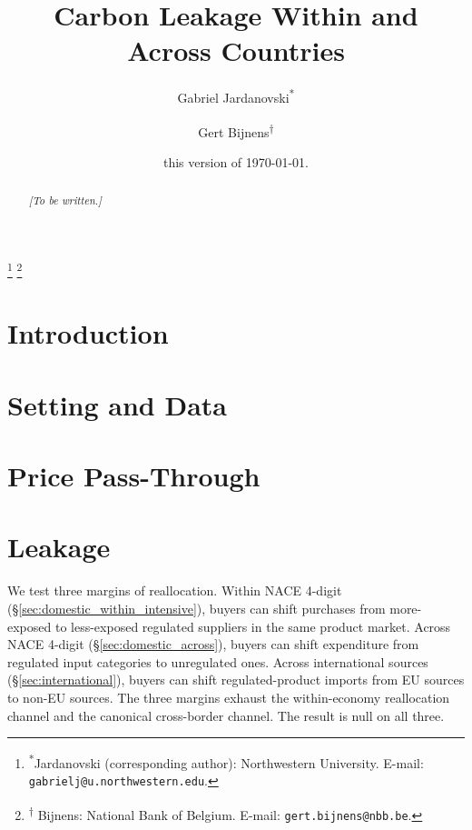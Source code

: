 \documentclass[11pt, reqno]{amsart}
\theoremstyle{definition}
\begin{document}
\title[]{Carbon Leakage Within and Across Countries}

\author[]{Gabriel Jardanovski\textsuperscript{*} \and Gert Bijnens\textsuperscript{$\dagger$}}
\thanks{\noindent \textsuperscript{*}Jardanovski (corresponding author): Northwestern University. E-mail: \texttt{gabrielj@u.northwestern.edu}.}
\thanks{\textsuperscript{$\dagger$} Bijnens: National Bank of Belgium. E-mail: \texttt{gert.bijnens@nbb.be}.}

\date{\tiny{\sc this version} of \today.}

\begin{abstract}
\textit{[To be written.]}
\end{abstract}

\maketitle

\pagebreak

\section{Introduction}\label{sec:introduction}


\section{Setting and Data}\label{sec:data}


\section{Price Pass-Through}\label{sec:passthrough}


\section{Leakage}\label{sec:leakage}

We test three margins of reallocation. Within NACE 4-digit (\S\ref{sec:domestic_within_intensive}), buyers can shift purchases from more-exposed to less-exposed regulated suppliers in the same product market. Across NACE 4-digit (\S\ref{sec:domestic_across}), buyers can shift expenditure from regulated input categories to unregulated ones. Across international sources (\S\ref{sec:international}), buyers can shift regulated-product imports from EU sources to non-EU sources. The three margins exhaust the within-economy reallocation channel and the canonical cross-border channel. The result is null on all three.
\end{document}
